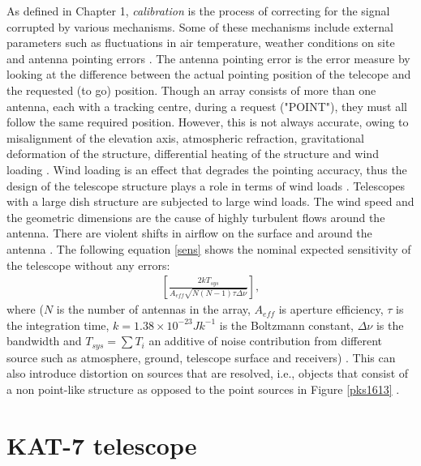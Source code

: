 As defined in Chapter 1, \textit{calibration} is the process of correcting for the signal corrupted by various mechanisms. Some of these mechanisms include external parameters such as fluctuations in air temperature, weather conditions on site and antenna pointing errors \citep{taylor1999synthesis}. The antenna pointing error is the error measure by looking at the difference between the actual pointing position  of the telecope and the requested (to go) position. Though an array consists of more than one antenna, each with a tracking centre, during a request ("POINT"), they must all follow the same required position. However, this is not always accurate, owing to misalignment of the elevation axis, atmospheric refraction, gravitational deformation of the structure, differential heating of the structure and wind loading \citep{taylor1999synthesis}. Wind loading is an effect that degrades the pointing accuracy, thus the design of the telescope structure plays a role in terms of wind loads \citep{smithdynamic}. Telescopes with a large dish structure are subjected to large wind loads. The wind speed and the geometric dimensions are the cause of highly turbulent flows around the antenna. There are violent shifts in airflow on the surface and around the antenna \citep{upnere2012characterization}. The following equation \ref{sens} shows the nominal expected sensitivity of the telescope without any errors:
\begin{align}
\left[\frac{2kT_{sys}}{A_{eff}\sqrt{N(N-1)\tau \Delta \nu}}\right]
\label{sens},
\end{align}
 where ($N$ is the number of antennas in the array,  $A_{eff}$ is aperture efficiency, $\tau$ is the integration time, $k=1.38\times 10^{-23}Jk^{-1}$ is the Boltzmann constant, $\Delta \nu$ is the bandwidth and $T_{sys}=\sum T_{i}$ an additive of noise contribution from different source such as atmosphere, ground, telescope surface and receivers) \citep{wilson2013tools}. This can also introduce distortion on sources that are resolved, i.e., objects that consist of a non point-like structure as opposed to the point sources in Figure \ref{pks1613} \citep{Calibration}. 



\section{KAT-7 telescope}
\label{kat7}

